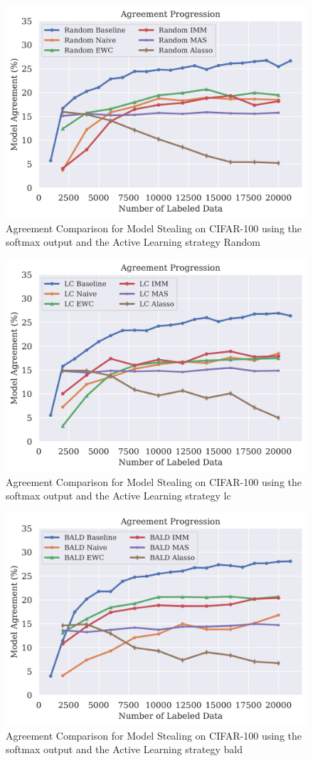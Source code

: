 \begin{figure}[!htb]
    \centering
    \includegraphics[width=0.5\linewidth]{images/results_CALMS/cifar100_softmax_random.png}
    \caption{Agreement Comparison for Model Stealing on CIFAR-100 using the softmax output and the Active Learning strategy Random}
    \label{fig:CALMSCIFAR100SoftmaxRandom}
\end{figure}

\begin{figure}[!htb]
    \centering
    \includegraphics[width=0.5\linewidth]{images/results_CALMS/cifar100_softmax_lc.png}
    \caption{Agreement Comparison for Model Stealing on CIFAR-100 using the softmax output and the Active Learning strategy \gls{lc}}
    \label{fig:CALMSCIFAR100SoftmaxLC}
\end{figure}

\begin{figure}[!htb]
    \centering
    \includegraphics[width=0.5\linewidth]{images/results_CALMS/cifar100_softmax_bald.png}
    \caption{Agreement Comparison for Model Stealing on CIFAR-100 using the softmax output and the Active Learning strategy \gls{bald}}
    \label{fig:CALMSCIFAR100SoftmaxBALD}
\end{figure}

